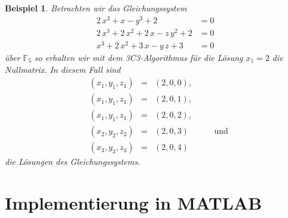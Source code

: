 \documentclass[a4paper,oneside, 11pt, openany%
]{article}
\newcommand{\F}[1]{\mathbb{F}_{#1}}
\theoremstyle{custom}
\theoremstyle{custom}
\newtheorem{example}{Beispiel}[section]
\begin{document}
\begin{example}
	Betrachten wir das Gleichungssystem
	\begin{equation}
		\begin{alignedat}{1}
2\,x^3+x-y^3+2&=0\\
 2\,x^3+2\,x^2+2\,x-z\,y^2+2&=0\\
  x^3+2\,x^2+3\,x-y\,z+3&=0
		\end{alignedat}
	\end{equation}
	über $\F{5}$ so erhalten wir mit dem 3C3-Algorithmus für die Lösung $x_1=2$ die Nullmatrix.
	In diesem Fall sind
	\begin{equation*}
		\begin{alignedat}{5}
			&\left( x_{1},y_{1},z_{1}\right) &=& \left(2,0,0 \right),&&\\
			&\left( x_{1},y_{1},z_{1}\right) &=& \left(2,0,1 \right),&&\\
			&\left( x_{1},y_{1},z_{1}\right) &=& \left(2,0,2 \right),&&\\
			&\left( x_{2},y_{2},z_{2}\right) &=& \left(2,0,3 \right)&& \quad\text{und} \\
			&\left( x_{3},y_{3},z_{3}\right) &=& \left(2,0,4 \right)&&
		\end{alignedat}
	\end{equation*}
	die Lösungen des Gleichungssystems.
\end{example}
\newpage


\section{Implementierung in MATLAB}\label{sec:matlab}
\end{document}
